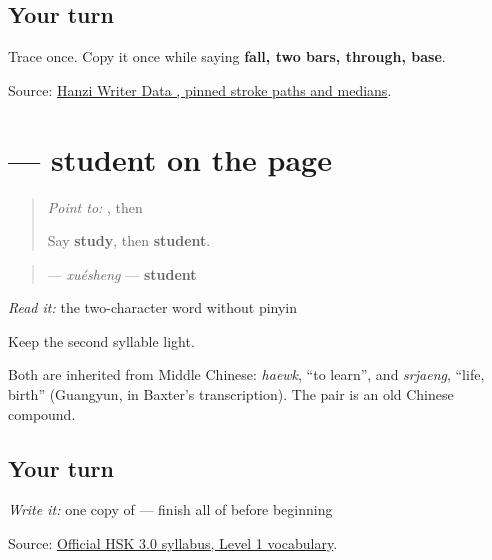 \subsection*{Your turn}
Trace \textbf{} once. Copy it once while saying \textbf{fall, two bars, through, base}.

\begin{tcolorbox}[breakable,colback=teal!4,colframe=teal!35!black,title={Before you move on}]
Source: \href{https://raw.githubusercontent.com/chanind/hanzi-writer-data/68d10a4b21150cae5e1ebbd223eed289cf32d90c/data/\%E7\%94\%9F.json}{Hanzi Writer Data , pinned stroke paths and medians}.
\end{tcolorbox}
\section[\texorpdfstring{\zh{学生} (xuésheng)}{学生 (xuésheng)}]{ — student on the page}

\label{lesson:ZH-C13-xuesheng}



\begin{quote}
\emph{Point to:} , then 

Say \textbf{study}, then \textbf{student}.
\end{quote}

\begin{cousinweb}
\begin{quote}
\textbf{} — \emph{xuésheng} — \textbf{student}
\end{quote}

\emph{Read it:} the two-character word without pinyin

Keep the second syllable light.

Both are inherited from Middle Chinese: \emph{haewk}, \textquotedblleft{}to learn\textquotedblright{}, and \emph{srjaeng}, \textquotedblleft{}life, birth\textquotedblright{} (Guangyun, in Baxter's transcription). The pair is an old Chinese compound.
\end{cousinweb}

\subsection*{Your turn}
\emph{Write it:} one copy of \textbf{} — finish all of  before beginning 

\begin{tcolorbox}[breakable,colback=teal!4,colframe=teal!35!black,title={Before you move on}]
Source: \href{https://hsk.cn-bj.ufileos.com/3.0/\%E6\%96\%B0\%E7\%89\%88HSK\%E8\%80\%83\%E8\%AF\%95\%E5\%A4\%A7\%E7\%BA\%B21219.pdf}{Official HSK 3.0 syllabus, Level 1 vocabulary}.
\end{tcolorbox}

